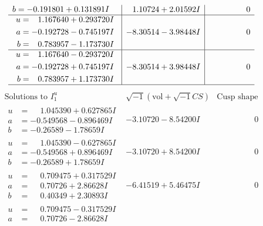 \documentclass[1p]{elsarticle_modified}
\theoremstyle{definition}
\newcommand{\I}{\sqrt{-1}}
\begin{document}
$$\begin{array}{c|c|c}
\begin{aligned}
b &= -0.191801 + 0.131891 I\end{aligned}
 & \phantom{-}1.10724 + 2.01592 I & \phantom{-0.000000 } 0 \\ \hline\begin{aligned}
u &= \phantom{-}1.167640 + 0.293720 I \\
a &= -0.192728 - 0.745197 I \\
b &= \phantom{-}0.783957 - 1.173730 I\end{aligned}
 & -8.30514 - 3.98448 I & \phantom{-0.000000 } 0 \\ \hline\begin{aligned}
u &= \phantom{-}1.167640 - 0.293720 I \\
a &= -0.192728 + 0.745197 I \\
b &= \phantom{-}0.783957 + 1.173730 I\end{aligned}
 & -8.30514 + 3.98448 I & \phantom{-0.000000 } 0\\
 \hline 
 \end{array}$$\newpage$$\begin{array}{c|c|c}  
\text{Solutions to }I^u_{1}& \I (\text{vol} + \sqrt{-1}CS) & \text{Cusp shape}\\
 \hline 
\begin{aligned}
u &= \phantom{-}1.045390 + 0.627865 I \\
a &= -0.549568 - 0.896469 I \\
b &= -0.26589 - 1.78659 I\end{aligned}
 & -3.10720 - 8.54200 I & \phantom{-0.000000 } 0 \\ \hline\begin{aligned}
u &= \phantom{-}1.045390 - 0.627865 I \\
a &= -0.549568 + 0.896469 I \\
b &= -0.26589 + 1.78659 I\end{aligned}
 & -3.10720 + 8.54200 I & \phantom{-0.000000 } 0 \\ \hline\begin{aligned}
u &= \phantom{-}0.709475 + 0.317529 I \\
a &= \phantom{-}0.70726 + 2.86628 I \\
b &= \phantom{-}0.40349 + 2.30893 I\end{aligned}
 & -6.41519 + 5.46475 I & \phantom{-0.000000 } 0 \\ \hline\begin{aligned}
u &= \phantom{-}0.709475 - 0.317529 I \\
a &= \phantom{-}0.70726 - 2.86628 I \\

\end{aligned}
\end{array}$$
\end{document}
